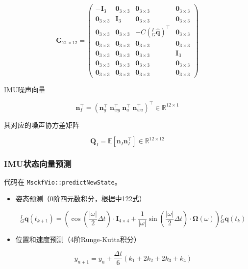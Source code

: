 \documentclass[12pt,a4paper]{article}
\begin{document}
\begin{equation*}
\mathbf{G}_{21 \times 12} = 
\begin{pmatrix}
-\mathbf{I}_3 & \mathbf{0}_{3\times 3} & 
\mathbf{0}_{3\times 3} & \mathbf{0}_{3\times 3} \\
\mathbf{0}_{3\times 3} & \mathbf{I}_3 & 
\mathbf{0}_{3\times 3} & \mathbf{0}_{3\times 3} \\
\mathbf{0}_{3\times 3} & \mathbf{0}_{3\times 3} & 
-C\left({}^I_G\hat{\mathbf{q}}\right)^\top & \mathbf{0}_{3\times 3} \\
\mathbf{0}_{3\times 3} & \mathbf{0}_{3\times 3} & 
\mathbf{0}_{3\times 3} & \mathbf{0}_{3\times 3} \\
\mathbf{0}_{3\times 3} & \mathbf{0}_{3\times 3} & 
\mathbf{0}_{3\times 3} & \mathbf{I}_3 \\
\mathbf{0}_{3\times 3} & \mathbf{0}_{3\times 3} & 
\mathbf{0}_{3\times 3} & \mathbf{0}_{3\times 3} \\
\mathbf{0}_{3\times 3} & \mathbf{0}_{3\times 3} & 
\mathbf{0}_{3\times 3} & \mathbf{0}_{3\times 3}
\end{pmatrix}
\end{equation*}

IMU噪声向量

\begin{equation*}
\mathbf{n}_I^\top = 
\left(\mathbf{n}_g^\top \; \mathbf{n}_{wg}^\top \; \mathbf{n}_a^\top \; \mathbf{n}_{wa}^\top\right)^\top
\in \mathbb{R}^{12 \times 1}
\end{equation*}

其对应的噪声协方差矩阵

\begin{equation*}
\mathbf{Q}_I = \mathbb{E}\left[\mathbf{n}_I^{}\mathbf{n}_I^\top\right]
\in \mathbb{R}^{12 \times 12}
\end{equation*}

\subsubsection{IMU状态向量预测}

代码在 \verb|MsckfVio::predictNewState|。

\begin{itemize}
\item 姿态预测（0阶四元数积分，根据\cite{trawny2005indirect}中122式）

\begin{equation}
{}^I_G \mathbf{q}(t_{k+1}) =
\left(
\cos \left(\frac{|\omega|}{2} \Delta t\right) \cdot \mathbf{I}_{4 \times 4}+\frac{1}{|\omega|} \sin \left(\frac{|\omega|}{2} \Delta t\right) \cdot \mathbf{\Omega}(\omega)
\right)
{}^I_G \mathbf{q}(t_k) 
\end{equation}

\item 位置和速度预测（4阶Runge-Kutta积分）

\begin{equation}
y_{n+1} = y_n + \frac{\Delta t}{6} (k_1 + 2k_2 + 2k_3 + k_4)
\end{equation}

\end{itemize}
\end{document}
